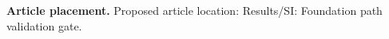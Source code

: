 \textbf{Article placement.} Proposed article location: Results/SI: Foundation path validation gate.
